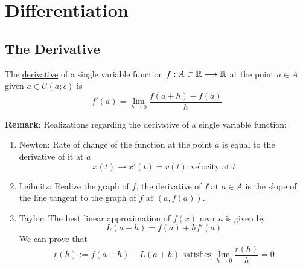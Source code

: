 \chapter{Differentiation}

\section{The Derivative}

\begin{definition}
    The \underline{derivative} of a single variable function $f:A\subset \mathbb{R} \longrightarrow \mathbb{R}$ 
    at the point $a\in A$ given $a \in U(a;\epsilon)$ is 
    $$f'(a)=\lim_{h \to 0}\frac{f(a+h)-f(a)}{h}$$
\end{definition}

\noindent \textbf{Remark}: Realizations regarding the derivative of a single variable function:
\begin{enumerate}
    \item Newton: Rate of change of the function at the point $a$ is equal to the derivative of it at $a$
    $$x(t)\longrightarrow x'(t)=v(t):\text{velocity at }t$$
    \item Leibnitz: Realize the graph of $f$, the derivative of $f$ at $a\in A$ is the slope of the line tangent to the graph of $f$ at $(a,f(a))$.
    \item Taylor: The best linear approximation of $f(x)$ near $a$ is given by $$L(a+h)=f(a)+hf'(a)$$
    We can prove that $$r(h):=f(a+h)-L(a+h)\text{ satisfies } \lim_{h \to 0}\frac{r(h)}{h}=0$$
\end{enumerate}

